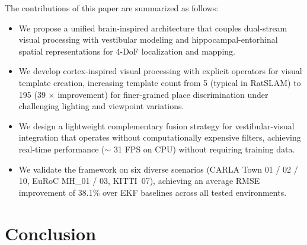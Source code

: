 \documentclass[preprint,12pt]{elsarticle}
\begin{document}
The contributions of this paper are summarized as follows:
\begin{itemize}
    \item We propose a unified brain-inspired architecture that couples dual-stream visual processing with vestibular modeling and hippocampal-entorhinal spatial representations for 4-DoF localization and mapping.
    \item We develop cortex-inspired visual processing with explicit operators for visual template creation, increasing template count from 5 (typical in RatSLAM) to 195 (39 $\times$ improvement) for finer-grained place discrimination under challenging lighting and viewpoint variations.
    \item We design a lightweight complementary fusion strategy for vestibular-visual integration that operates without computationally expensive filters, achieving real-time performance ($\sim$ 31 FPS on CPU) without requiring training data.
    \item We validate the framework on six diverse scenarios (CARLA Town 01 / 02 / 10, EuRoC MH\_01 / 03, KITTI~07), achieving an average RMSE improvement of 38.1\% over EKF baselines across all tested environments.
\end{itemize}










\section{Conclusion}
\label{sec:conclusion}
\end{document}
